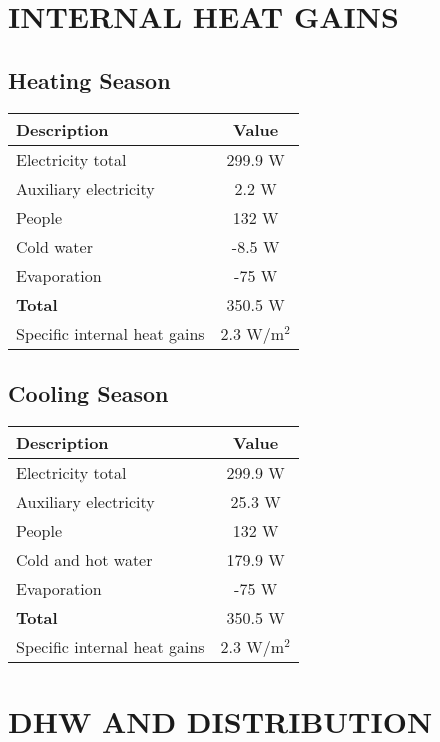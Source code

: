 \documentclass{article}
\begin{document}
\vspace{1cm}

\section*{INTERNAL HEAT GAINS}
\subsection*{Heating Season}
\begin{tabular}{@{}lc@{}}
\toprule
Description & Value \\ \midrule
Electricity total & 299.9 W \\
Auxiliary electricity & 2.2 W \\
People & 132 W \\
Cold water & -8.5 W \\
Evaporation & -75 W \\ \midrule
\textbf{Total} & 350.5 W \\
Specific internal heat gains & 2.3 W/m$^2$ \\ \bottomrule
\end{tabular}

\vspace{1cm}

\subsection*{Cooling Season}
\begin{tabular}{@{}lc@{}}
\toprule
Description & Value \\ \midrule
Electricity total & 299.9 W \\
Auxiliary electricity & 25.3 W \\
People & 132 W \\
Cold and hot water & 179.9 W \\
Evaporation & -75 W \\ \midrule
\textbf{Total} & 350.5 W \\
Specific internal heat gains & 2.3 W/m$^2$ \\ \bottomrule
\end{tabular}


\section*{DHW AND DISTRIBUTION}
\end{document}
